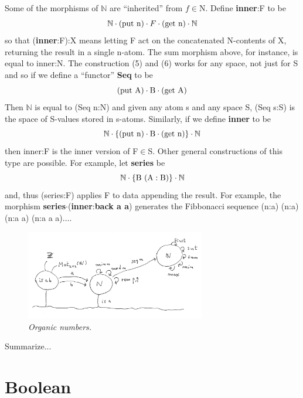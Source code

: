 \documentclass[11pt]{article}
\begin{document}
Some of the morphisms of ${\mathbb N}$ are ``inherited'' from $f\in$N.  Define {\bf inner}:F to be 
\begin{equation}
{\mathbb N}\cdot({\rm put\ n})\cdot F\cdot({\rm get\ n})\cdot{\mathbb N}
\end{equation}
so that ({\bf inner}:F):X means letting F act on the concatenated N-contents of X, returning the result in a single n-atom.  The sum morphism 
above, for instance, is equal to inner:N.  The construction (5) and (6) works for any space, not just for S and so if we define a ``functor'' {\bf Seq} 
to be 
\begin{equation}
({\rm put}\ {\rm A})\cdot {\rm B} \cdot ({\rm get}\ {\rm A})
\end{equation}
Then {$\mathbb N$} is equal to (Seq n:N) and given any atom s and any space S, (Seq s:S) is the space of S-values stored in s-atoms.  
Similarly, if we define {\bf inner} to be  
\begin{equation}
{\mathbb N}\cdot\{({\rm put\ n})\cdot{\rm B}\cdot({\rm get\ n})\}\cdot{\mathbb N}
\end{equation}
then inner:F is the inner version of F$\in$S.  Other general constructions of this type are possible.  For example, let {\bf series} be 
\begin{equation}
{\mathbb N}\cdot\{{\rm B\ (A:B)}\}\cdot{\mathbb N} 
\end{equation}
and, thus (series:F) applies F to data appending the result.  For example, the morphism {\bf series}$\cdot$({\bf inner}:{\bf back a a}) 
generates the Fibbonacci sequence (n:a) (n:a) (n:a a) (n:a a a)$\dots$.


\begin{figure}[h]
\centering
\includegraphics[width=0.7\textwidth]{organics.png}
\caption{{\it Organic numbers.}}
\end{figure}

Summarize...

\section{Boolean} 
\end{document}
